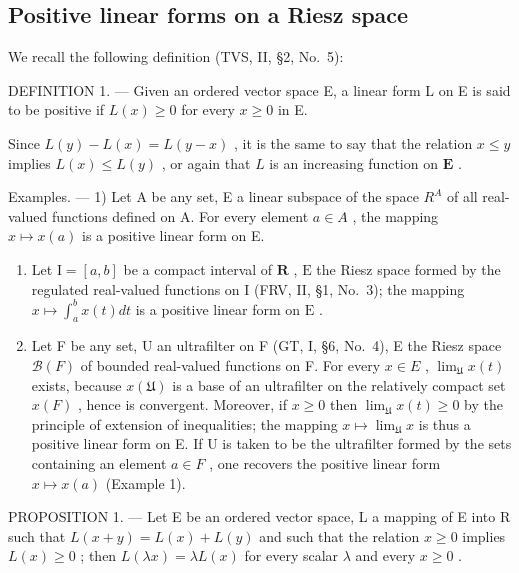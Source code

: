 \subsection{Positive linear forms on a Riesz space}

We recall the following definition (TVS, II, §2, No.~5):

DEFINITION 1. --- Given an ordered vector space E, a linear form L on E is said to be positive if \(L(x) \geqslant 0\) for every \(x \geqslant 0\) in E.

Since \(L(y) - L(x) = L(y - x)\) , it is the same to say that the relation \(x \leqslant y\) implies \(L(x) \leqslant L(y)\) , or again that \(L\) is an increasing function on \(\mathbf{E}\) .

Examples. --- 1) Let A be any set, E a linear subspace of the space \(R^{A}\) of all real-valued functions defined on A. For every element \(a \in A\) , the mapping \(x \mapsto x(a)\) is a positive linear form on E.

\begin{enumerate}
\def\labelenumi{\arabic{enumi})}
\setcounter{enumi}{1}
\item
  Let \(\mathrm{I} = [a, b]\) be a compact interval of \(\mathbf{R}\) , \(\mathrm{E}\) the Riesz space formed by the regulated real-valued functions on \(\mathrm{I}\) (FRV, II, §1, No.~3); the mapping \(x \mapsto \int_{a}^{b} x(t) dt\) is a positive linear form on \(\mathrm{E}\) .
\item
  Let F be any set, U an ultrafilter on F (GT, I, §6, No.~4), E the Riesz space \(\mathcal{B}(F)\) of bounded real-valued functions on F. For every \(x \in E\) , \(\lim_{\mathfrak{U}} x(t)\) exists, because \(x(\mathfrak{U})\) is a base of an ultrafilter on the relatively compact set \(x(F)\) , hence is convergent. Moreover, if \(x \geqslant 0\) then \(\lim_{\mathfrak{U}} x(t) \geqslant 0\) by the principle of extension of inequalities; the mapping \(x \mapsto \lim_{\mathfrak{U}} x\) is thus a positive linear form on E. If U is taken to be the ultrafilter formed by the sets containing an element \(a \in F\) , one recovers the positive linear form \(x \mapsto x(a)\) (Example 1).
\end{enumerate}

PROPOSITION 1. --- Let E be an ordered vector space, L a mapping of E into R such that \(L(x+y)=L(x)+L(y)\) and such that the relation \(x\geqslant0\) implies \(L(x)\geqslant0\) ; then \(L(\lambda x)=\lambda L(x)\) for every scalar \(\lambda\) and every \(x\geqslant0\) .

